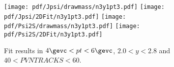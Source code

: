 \begin{figure}[H]
\begin{center}
\texttt{[image: pdf/Jpsi/drawmass/n3y1pt3.pdf]}
\texttt{[image: pdf/Jpsi/2DFit/n3y1pt3.pdf]}
\vspace*{-0.5cm}
\texttt{[image: pdf/Psi2S/drawmass/n3y1pt3.pdf]}
\texttt{[image: pdf/Psi2S/2DFit/n3y1pt3.pdf]}
\vspace*{-0.5cm}
\end{center}
\caption{Fit results in $4\gevc<pt<6\gevc$, $2.0<y<2.8$ and $40<PVNTRACKS<60$.}
\label{Fitn3y1pt3}
\end{figure}
